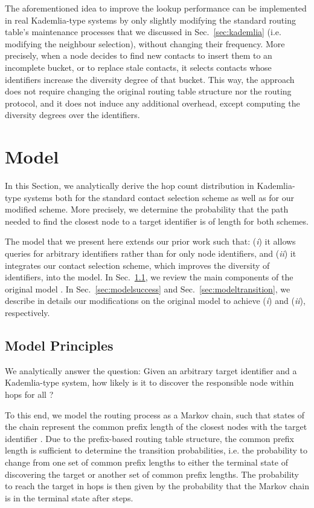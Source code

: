 \documentclass[10pt, conference, compsocconf, letterpaper]{IEEEtran}
\begin{document}
The aforementioned idea to improve the lookup performance can be implemented in real Kademlia-type systems by only slightly modifying the standard routing table's maintenance processes that we discussed in Sec.~\ref{sec:kademlia} (i.e. modifying the neighbour selection), without changing their frequency. More precisely, when a node decides to find new contacts to insert them to an incomplete bucket, or to replace stale contacts, it selects contacts whose identifiers increase the  diversity degree of that bucket. This way, the approach does not require changing the original routing table structure nor the routing protocol, and it does not induce any additional overhead, except computing the diversity degrees over the identifiers. 



\section{Model} \label{sec:model}

In this Section, we analytically derive the hop count distribution in Kademlia-type systems
both for the standard contact selection scheme as well as for our modified scheme. More precisely, we determine the probability that the path needed to find the closest node to a target identifier  is of length  for both schemes. 

The model that we present here extends our prior work \cite{roos13comprehending} such that:  (\emph{i}) it allows queries for arbitrary identifiers rather than for only node identifiers, and (\emph{ii}) it integrates our contact selection scheme, which improves the diversity of identifiers, into the model. In Sec.~\ref{sec:modelreview}, we review the main components of the original model \cite{roos13comprehending}. In Sec.~\ref{sec:modelsuccess} and Sec.~\ref{sec:modeltransition}, we describe in details our modifications on the original model to achieve (\emph{i}) and (\emph{ii}), respectively.

\subsection{Model Principles} \label{sec:modelreview}
We analytically answer the question:
Given an arbitrary target identifier  and a Kademlia-type system, how likely is it
to discover the responsible node within  hops for all ?

To this end, we model the routing process as a Markov chain, such that states of the chain represent the 
common prefix length of the  closest nodes with the target identifier . 
Due to the prefix-based routing table structure, the common prefix length is sufficient
to determine the transition probabilities, i.e. the probability to change
from one set of common prefix lengths to either the terminal state of discovering the target or 
another set of  common prefix lengths.
The probability to reach the target in  hops is then given by the probability that
the Markov chain is in the terminal state after  steps.
\end{document}
